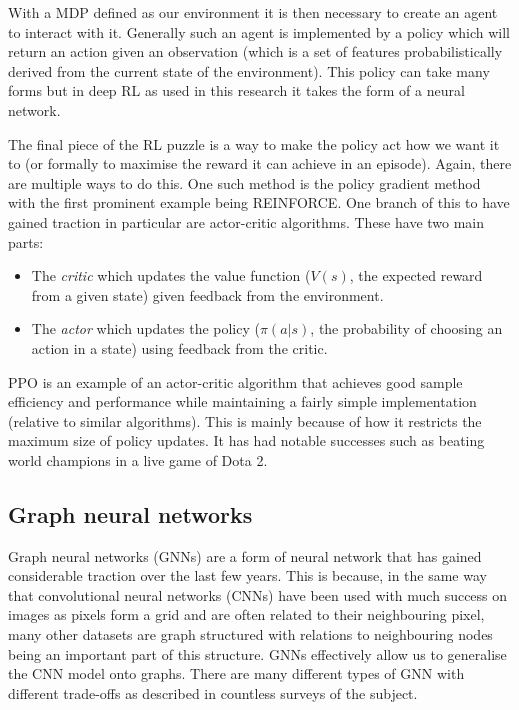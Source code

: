 With a MDP defined as our environment it is then necessary to create an agent to interact with it. Generally such an agent is implemented by a policy which will return an action given an observation (which is a set of features probabilistically derived from the current state of the environment). This policy can take many forms but in deep RL as used in this research it takes the form of a neural network.

The final piece of the RL puzzle is a way to make the policy act how we want it to (or formally to maximise the reward it can achieve in an episode). Again, there are multiple ways to do this. One such method is the policy gradient method with the first prominent example being REINFORCE\cite{williams1992simple}. One branch of this to have gained traction in particular are actor-critic algorithms. These have two main parts:

\begin{itemize}
    \item The \emph{critic} which updates the value function ($V(s)$, the expected reward from a given state) given feedback from the environment.
    \item The \emph{actor} which updates the policy ($\pi(a|s)$, the probability of choosing an action in a state) using feedback from the critic.
\end{itemize}

PPO\cite{schulman2017proximal} is an example of an actor-critic algorithm that achieves good sample efficiency and performance while maintaining a fairly simple implementation (relative to similar algorithms). This is mainly because of how it restricts the maximum size of policy updates. It has had notable successes such as beating world champions in a live game of Dota 2\cite{openai2019dota}.

\subsection{Graph neural networks}
\label{section:graph_neural_networks}

Graph neural networks (GNNs)\cite{gori2005new,scarselli2008graph} are a form of neural network that has gained considerable 
traction over the last few years. This is because, in the same way that convolutional neural networks (CNNs) have been used with much success on images as pixels form a grid and are often related to their neighbouring pixel, many other datasets are graph structured with relations to neighbouring nodes being an important part of this structure. GNNs effectively allow us to generalise the CNN model onto graphs. There are many different types of GNN with different trade-offs as described in countless surveys of the subject\cite{zhou2018graph,Wu_2020}.

